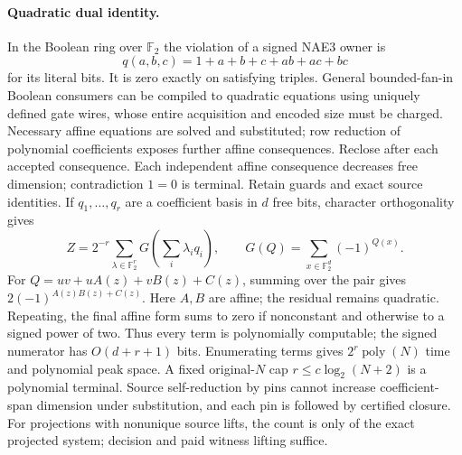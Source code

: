 \documentclass[11pt]{article}
\begin{document}
\paragraph{Quadratic dual identity.}
In the Boolean ring over $\mathbb F_2$ the violation of a signed NAE3 owner is
\[
q(a,b,c)=1+a+b+c+ab+ac+bc
\]
for its literal bits. It is zero exactly on satisfying triples. General bounded-fan-in Boolean consumers can be compiled to quadratic equations using uniquely defined gate wires, whose entire acquisition and encoded size must be charged. Necessary affine equations are solved and substituted; row reduction of polynomial coefficients exposes further affine consequences. Reclose after each accepted consequence. Each independent affine consequence decreases free dimension; contradiction $1=0$ is terminal. Retain guards and exact source identities. If $q_1,\ldots,q_r$ are a coefficient basis in $d$ free bits, character orthogonality gives
\[
Z=2^{-r}\sum_{\lambda\in\mathbb F_2^r}G\!\left(\sum_i\lambda_iq_i\right),
\qquad
G(Q)=\sum_{x\in\mathbb F_2^d}(-1)^{Q(x)}.
\]
For $Q=uv+uA(z)+vB(z)+C(z)$, summing over the pair gives $2(-1)^{A(z)B(z)+C(z)}$. Here $A,B$ are affine; the residual remains quadratic. Repeating, the final affine form sums to zero if nonconstant and otherwise to a signed power of two. Thus every term is polynomially computable; the signed numerator has $O(d+r+1)$ bits. Enumerating terms gives $2^r\operatorname{poly}(N)$ time and polynomial peak space. A fixed original-$N$ cap $r\le c\log_2(N+2)$ is a polynomial terminal. Source self-reduction by pins cannot increase coefficient-span dimension under substitution, and each pin is followed by certified closure. For projections with nonunique source lifts, the count is only of the exact projected system; decision and paid witness lifting suffice.
\end{document}
